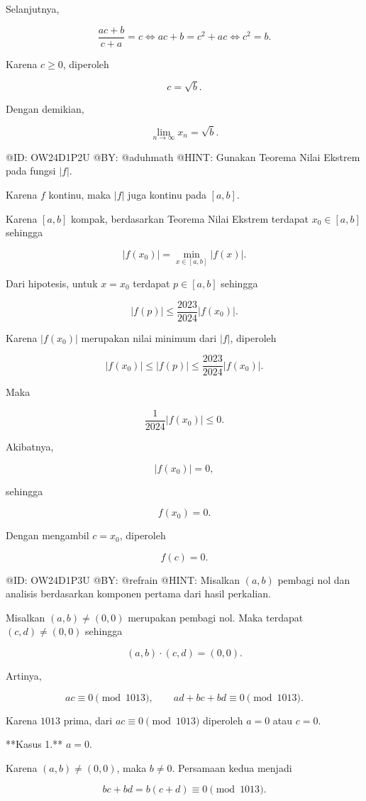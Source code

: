 Selanjutnya,

$$
\frac{ac+b}{c+a}=c
\iff
ac+b=c^2+ac
\iff
c^2=b.
$$

Karena $c\ge0$, diperoleh

$$
c=\sqrt b.
$$

Dengan demikian,

$$
\boxed{\lim_{n\to\infty}x_n=\sqrt b.}
$$

@ID: OW24D1P2U
@BY: @aduhmath
@HINT: Gunakan Teorema Nilai Ekstrem pada fungsi $|f|$.

Karena $f$ kontinu, maka $|f|$ juga kontinu pada $[a,b]$.

Karena $[a,b]$ kompak, berdasarkan Teorema Nilai Ekstrem terdapat $x_0\in[a,b]$ sehingga

$$
|f(x_0)|=\min_{x\in[a,b]}|f(x)|.
$$

Dari hipotesis, untuk $x=x_0$ terdapat $p\in[a,b]$ sehingga

$$
|f(p)|\le\frac{2023}{2024}|f(x_0)|.
$$

Karena $|f(x_0)|$ merupakan nilai minimum dari $|f|$, diperoleh

$$
|f(x_0)|
\le
|f(p)|
\le
\frac{2023}{2024}|f(x_0)|.
$$

Maka

$$
\frac1{2024}|f(x_0)|\le0.
$$

Akibatnya,

$$
|f(x_0)|=0,
$$

sehingga

$$
f(x_0)=0.
$$

Dengan mengambil $c=x_0$, diperoleh

$$
\boxed{f(c)=0.}
$$

@ID: OW24D1P3U
@BY: @refrain
@HINT: Misalkan $(a,b)$ pembagi nol dan analisis berdasarkan komponen pertama dari hasil perkalian.

Misalkan $(a,b)\ne(0,0)$ merupakan pembagi nol. Maka terdapat $(c,d)\ne(0,0)$ sehingga

$$
(a,b)\cdot(c,d)=(0,0).
$$

Artinya,

$$
ac\equiv0\pmod{1013},
\qquad
ad+bc+bd\equiv0\pmod{1013}.
$$

Karena $1013$ prima, dari $ac\equiv0\pmod{1013}$ diperoleh $a=0$ atau $c=0$.

**Kasus 1.** $a=0$.

Karena $(a,b)\ne(0,0)$, maka $b\ne0$. Persamaan kedua menjadi

$$
bc+bd=b(c+d)\equiv0\pmod{1013}.
$$

